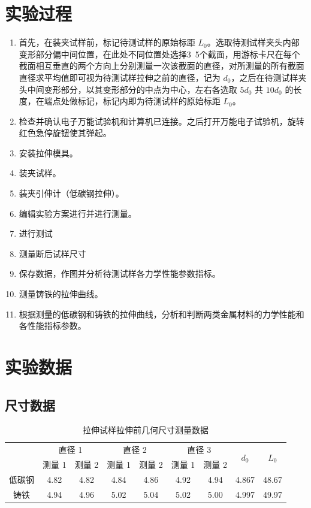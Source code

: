 \section{实验过程}%
\begin{enumerate}
    \item 首先，在装夹试样前，标记待测试样的原始标距 $L_0$。选取待测试样夹头内部变形部分偏中间位置，在此处不同位置处选择3~5个截面，用游标卡尺在每个截面相互垂直的两个方向上分别测量一次该截面的直径，对所测量的所有截面直径求平均值即可视为待测试样拉伸之前的直径，记为 $d_0$，之后在待测试样夹头中间变形部分，以其变形部分的中点为中心，左右各选取 $5d_0$ 共 $10d_0$ 的长度，在端点处做标记，标记内即为待测试样的原始标距 $L_0$。
    \item 检查并确认电子万能试验机和计算机已连接。之后打开万能电子试验机，旋转红色急停旋钮使其弹起。
    \item 安装拉伸模具。
    \item 装夹试样。
    \item 装夹引伸计（低碳钢拉伸）。
    \item 编辑实验方案进行并进行测量。
    \item 进行测试
    \item 测量断后试样尺寸
    \item 保存数据，作图并分析待测试样各力学性能参数指标。
    \item 测量铸铁的拉伸曲线。
    \item 根据测量的低碳钢和铸铁的拉伸曲线，分析和判断两类金属材料的力学性能和各性能指标参数。
\end{enumerate}
\section{实验数据}
\subsection{尺寸数据}
\begin{table}[!ht]
    \caption{拉伸试样拉伸前几何尺寸测量数据}
    \begin{tabular}{*{9}{c}}\toprule
        & \multicolumn{2}{c}{直径 1} & \multicolumn{2}{c}{直径 2} & \multicolumn{2}{c}{直径 3} & \multirow[c]{2}{*}{$d_0$} & \multirow[c]{2}{*}{$L_0$} \\
        & 测量 1 & 测量 2 & 测量 1 & 测量 2 & 测量 1 & 测量 2 & & \\ \midrule
        低碳钢 & 4.82 & 4.82 & 4.84 & 4.86 & 4.92 & 4.94 & 4.867 & 48.67 \\ 
        铸铁 & 4.94 & 4.96 & 5.02 & 5.04 & 5.02 & 5.00 & 4.997 & 49.97 \\ \bottomrule
    \end{tabular}
\end{table}

